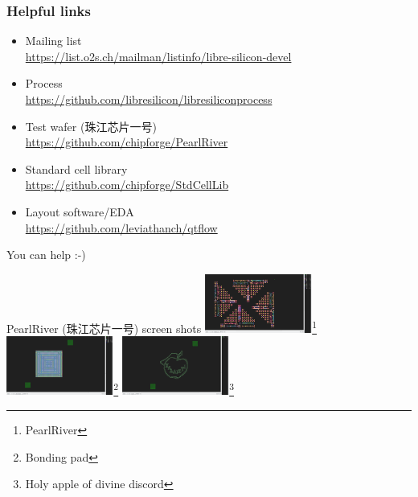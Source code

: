 \documentclass{beamer}
\begin{document}
\begin{frame}
\frametitle{Helpful links}
\begin{itemize}
	\item Mailing list \\
	\url{https://list.o2s.ch/mailman/listinfo/libre-silicon-devel}
	\item Process \\
	\url{https://github.com/libresilicon/libresiliconprocess}
	\item Test wafer (\cjkfont 珠江芯片一号) \\
	\url{https://github.com/chipforge/PearlRiver}
	\item Standard cell library \\
	\url{https://github.com/chipforge/StdCellLib}
	\item Layout software/EDA \\
	\url{https://github.com/leviathanch/qtflow}
\end{itemize}
\Huge{\centerline{You can help :-)}}
\end{frame}

\begin{frame}{PearlRiver (\cjkfont 珠江芯片一号) screen shots}
	\includegraphics[width=100pt]{Screenshot_20180929_015838.png}\footnote{PearlRiver}
	\includegraphics[width=100pt]{Screenshot_20180929_020016.png}\footnote{Bonding pad}
	\includegraphics[width=100pt]{Screenshot_20180929_023204.png}\footnote{Holy apple of divine discord}
\end{frame}
\end{document}

